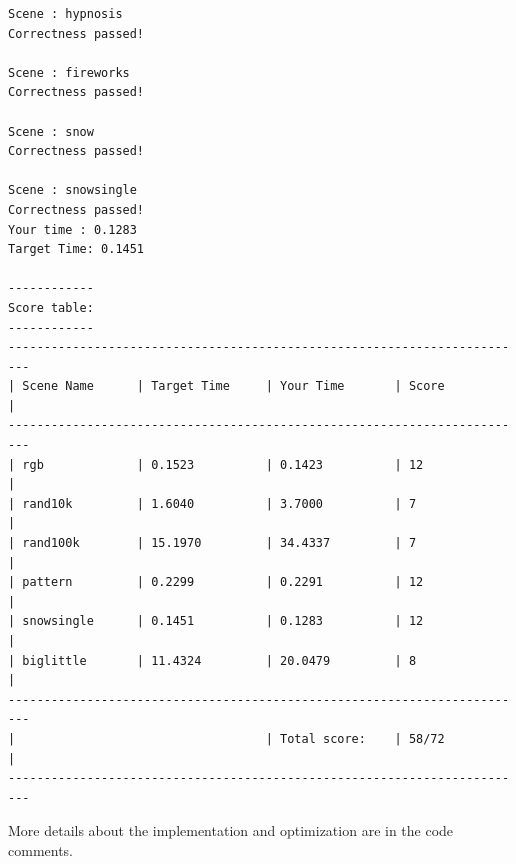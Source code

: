 \documentclass[letterpaper,11pt]{exam}
\begin{document}
\begin{questions}
\begin{enumerate}[label=\roman*.]
\begin{itemize}
\begin{lstlisting}
Scene : hypnosis
Correctness passed!

Scene : fireworks
Correctness passed!

Scene : snow
Correctness passed!

Scene : snowsingle
Correctness passed!
Your time : 0.1283
Target Time: 0.1451

------------
Score table:
------------
-------------------------------------------------------------------------
| Scene Name      | Target Time     | Your Time       | Score           |
-------------------------------------------------------------------------
| rgb             | 0.1523          | 0.1423          | 12              |
| rand10k         | 1.6040          | 3.7000          | 7               |
| rand100k        | 15.1970         | 34.4337         | 7               |
| pattern         | 0.2299          | 0.2291          | 12              |
| snowsingle      | 0.1451          | 0.1283          | 12              |
| biglittle       | 11.4324         | 20.0479         | 8               |
-------------------------------------------------------------------------
|                                   | Total score:    | 58/72           |
-------------------------------------------------------------------------
                        \end{lstlisting}

                        More details about the implementation and optimization are in the code comments.
              \end{itemize}

    \end{enumerate}





    \newpage





\end{questions}
\end{document}
